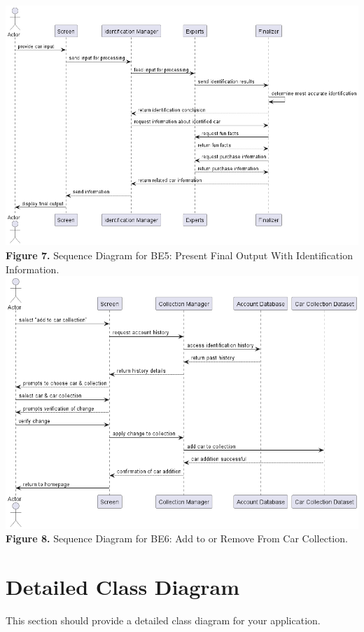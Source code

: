 \documentclass[]{article}
\begin{document}
\begin{center}
	\includegraphics[scale=0.55]{Sequence Diagrams/BE5_Sequence_Diagram.png}\\
	\textbf{Figure 7.} Sequence Diagram for BE5: Present Final Output With Identification Information.\\

	\includegraphics[scale=0.55]{Sequence Diagrams/BE6_Sequence_Diagram.png}\\
	\textbf{Figure 8.} Sequence Diagram for BE6: Add to or Remove From Car Collection.\\
\end{center}

\section{Detailed Class Diagram}
\label{sec:detailed_class_diagram}
This section should provide a detailed class diagram for your application.
\end{document}

